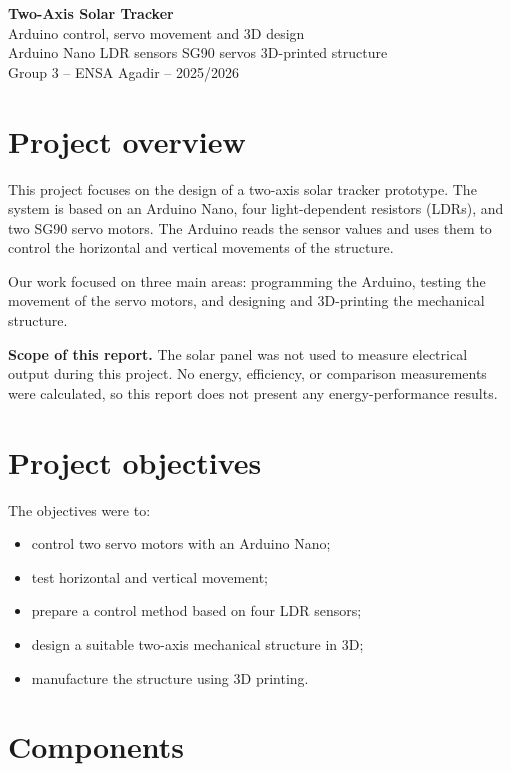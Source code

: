 \documentclass[10pt,a4paper]{article}
\begin{document}
\begin{center}
  {\Large\bfseries\color{pink} Two-Axis Solar Tracker}\\[0.2em]
  {\large Arduino control, servo movement and 3D design}\\[0.5em]
  {\small Arduino Nano \textbullet{} LDR sensors \textbullet{} SG90 servos \textbullet{} 3D-printed structure}\\[0.35em]
  {\footnotesize Group 3 -- ENSA Agadir -- 2025/2026}
\end{center}

\section{Project overview}

This project focuses on the design of a two-axis solar tracker prototype. The system is based on an Arduino Nano, four light-dependent resistors (LDRs), and two SG90 servo motors. The Arduino reads the sensor values and uses them to control the horizontal and vertical movements of the structure.

Our work focused on three main areas: programming the Arduino, testing the movement of the servo motors, and designing and 3D-printing the mechanical structure.

\textbf{Scope of this report.} The solar panel was not used to measure electrical output during this project. No energy, efficiency, or comparison measurements were calculated, so this report does not present any energy-performance results.

\section{Project objectives}

The objectives were to:
\begin{itemize}
  \item control two servo motors with an Arduino Nano;
  \item test horizontal and vertical movement;
  \item prepare a control method based on four LDR sensors;
  \item design a suitable two-axis mechanical structure in 3D;
  \item manufacture the structure using 3D printing.
\end{itemize}

\section{Components}
\end{document}
